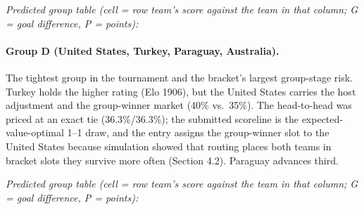 \documentclass[11pt,letterpaper]{article}
\begin{document}
\noindent\textit{\footnotesize Predicted group table (cell = row team's score against the team in that column; G = goal difference, P = points):}



\paragraph{Group D (United States, Turkey, Paraguay, Australia).} The tightest group in the tournament and the bracket's largest group-stage risk. Turkey holds the higher rating (Elo 1906), but the United States carries the host adjustment and the group-winner market (40\% vs.\ 35\%). The head-to-head was priced at an exact tie (36.3\%/36.3\%); the submitted scoreline is the expected-value-optimal 1--1 draw, and the entry assigns the group-winner slot to the United States because simulation showed that routing places both teams in bracket slots they survive more often (Section 4.2). Paraguay advances third.

\noindent\textit{\footnotesize Predicted group table (cell = row team's score against the team in that column; G = goal difference, P = points):}

\end{document}

